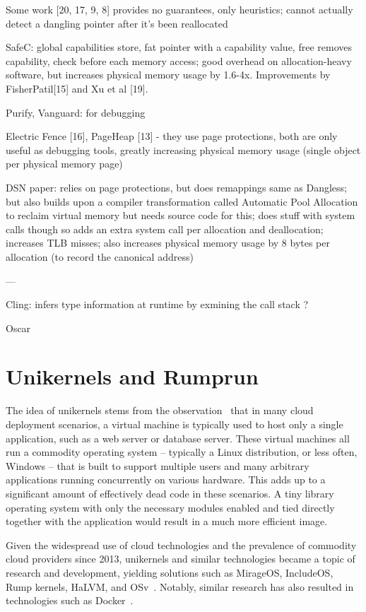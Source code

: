 Some work [20, 17, 9, 8] provides no guarantees, only heuristics; cannot actually detect a dangling pointer after it's been reallocated

SafeC: global capabilities store, fat pointer with a capability value, free removes capability, check before each memory access; good overhead on allocation-heavy software, but increases physical memory usage by 1.6-4x. Improvements by FisherPatil[15] and Xu et al [19].

Purify, Vanguard: for debugging

Electric Fence [16], PageHeap [13]
 - they use page protections, both are only useful as debugging tools, greatly increasing physical memory usage (single object per physical memory page)

DSN paper: relies on page protections, but does remappings same as Dangless; but also builds upon a compiler transformation called Automatic Pool Allocation to reclaim virtual memory but needs source code for this; does stuff with system calls though so adds an extra system call per allocation and deallocation; increases TLB misses; also increases physical memory usage by 8 bytes per allocation (to record the canonical address)

---

Cling: infers type information at runtime by exmining the call stack ?

Oscar

\section{Unikernels and Rumprun}

The idea of unikernels stems from the observation~\cite{unikernels-intro} that in many cloud deployment scenarios, a virtual machine is typically used to host only a single application, such as a web server or database server. These virtual machines all run a commodity operating system -- typically a Linux distribution, or less often, Windows -- that is built to support multiple users and many arbitrary applications running concurrently on various hardware. This adds up to a significant amount of effectively dead code in these scenarios.
A tiny library operating system with only the necessary modules enabled and tied directly together with the application would result in a much more efficient image.

Given the widespread use of cloud technologies and the prevalence of commodity cloud providers since 2013, unikernels and similar technologies became a topic of research and development, yielding solutions such as MirageOS, IncludeOS, Rump kernels, HaLVM, and OSv~\cite{unikernels-list}. Notably, similar research has also resulted in technologies such as Docker~\cite{docker-web}.


